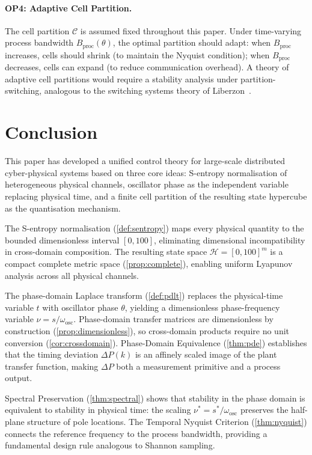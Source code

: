 \documentclass[10pt,twocolumn]{article}
\theoremstyle{plain}
\theoremstyle{definition}
\theoremstyle{remark}
\newcommand{\Hcal}{\mathcal{H}}
\newcommand{\Ccal}{\mathcal{C}}
\newcommand{\DeltaP}{\Delta P}
\newcommand{\omegaosc}{\omega_{\mathrm{osc}}}
\newcommand{\Bproc}{B_{\mathrm{proc}}}
\begin{document}
\paragraph{OP4: Adaptive Cell Partition.}
The cell partition $\Ccal$ is assumed fixed throughout this paper.
Under time-varying process bandwidth $\Bproc(\theta)$, the optimal
partition should adapt: when $\Bproc$ increases, cells should shrink
(to maintain the Nyquist condition); when $\Bproc$ decreases, cells
can expand (to reduce communication overhead).  A theory of adaptive
cell partitions would require a stability analysis under
partition-switching, analogous to the switching systems theory of
Liberzon~\cite{Liberzon2003}.

\section{Conclusion}
\label{sec:conclusion}

This paper has developed a unified control theory for large-scale
distributed cyber-physical systems based on three core ideas:
S-entropy normalisation of heterogeneous physical channels, oscillator
phase as the independent variable replacing physical time, and a
finite cell partition of the resulting state hypercube as the
quantisation mechanism.

The S-entropy normalisation (\cref{def:sentropy}) maps every physical
quantity to the bounded dimensionless interval $[0,100]$, eliminating
dimensional incompatibility in cross-domain composition.  The resulting
state space $\Hcal = [0,100]^m$ is a compact complete metric space
(\cref{prop:complete}), enabling uniform Lyapunov analysis across all
physical channels.

The phase-domain Laplace transform (\cref{def:pdlt}) replaces the
physical-time variable $t$ with oscillator phase $\theta$, yielding a
dimensionless phase-frequency variable $\nu = s/\omegaosc$.
Phase-domain transfer matrices are dimensionless by construction
(\cref{prop:dimensionless}), so cross-domain products require no unit
conversion (\cref{cor:crossdomain}).  Phase-Domain Equivalence
(\cref{thm:pde}) establishes that the timing deviation $\DeltaP(k)$
is an affinely scaled image of the plant transfer function, making
$\DeltaP$ both a measurement primitive and a process output.

Spectral Preservation (\cref{thm:spectral}) shows that stability in
the phase domain is equivalent to stability in physical time: the
scaling $\nu^* = s^*/\omegaosc$ preserves the half-plane structure
of pole locations.  The Temporal Nyquist Criterion (\cref{thm:nyquist})
connects the reference frequency to the process bandwidth, providing a
fundamental design rule analogous to Shannon sampling.
\end{document}

